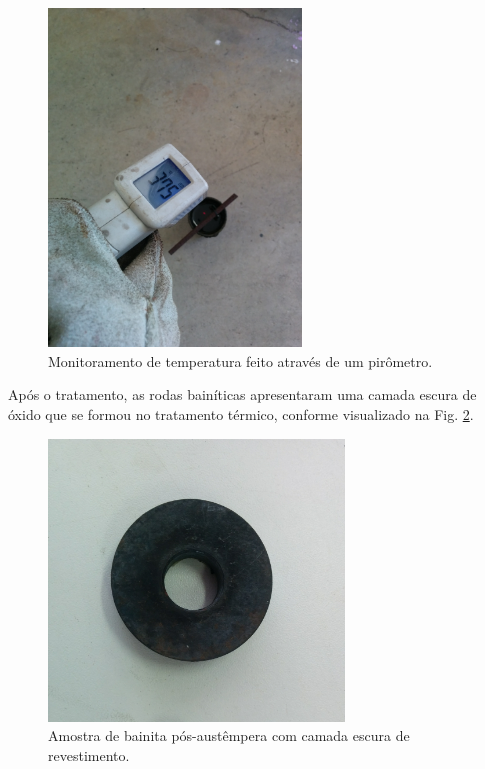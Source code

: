 \documentclass[
12pt,
openany, %
oneside, %
a4paper,			
english,			
brazil			        %
]{abntbibufjf}
\begin{document}
	\begin{figure}[H]
		\centering
		\includegraphics[width=0.6\textwidth]{pirometro}
		\caption{Monitoramento de temperatura feito através de um pirômetro.}
		\label{fig:pirometro}
	\end{figure}

	Após o tratamento, as rodas bainíticas apresentaram uma camada escura de óxido que se formou no tratamento térmico, conforme visualizado na Fig. \ref{fig:amostra_bainita}.
	
	\begin{figure}[H]
		\centering
		\includegraphics[width=0.7\textwidth]{amostra_bainita}
		\caption{Amostra de bainita pós-austêmpera com camada escura de revestimento.}
		\label{fig:amostra_bainita}
	\end{figure}
\end{document}
